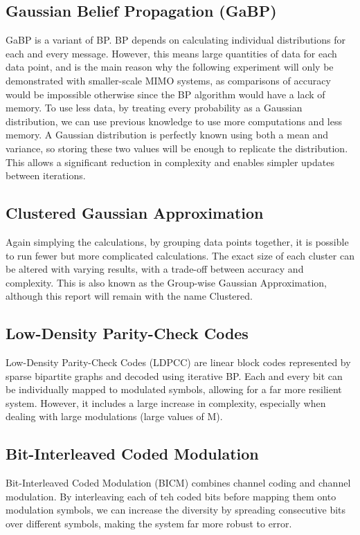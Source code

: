 \documentclass[conference]{IEEEtran}
\begin{document}
\subsection{Gaussian Belief Propagation (GaBP)}
GaBP is a variant of BP. BP depends on calculating individual distributions for each and every message. However, this means large quantities of data for each data point, and is the main reason why the following experiment will only be demonstrated with smaller-scale MIMO systems, as comparisons of accuracy would be impossible otherwise since the BP algorithm would have a lack of memory. To use less data, by treating every probability as a Gaussian distribution, we can use previous knowledge to use more computations and less memory. A Gaussian distribution is perfectly known using both a mean and variance, so storing these two values will be enough to replicate the distribution. This allows a significant reduction in complexity and enables simpler updates between iterations.

\subsection{Clustered Gaussian Approximation}
Again simplying the calculations, by grouping data points together, it is possible to run fewer but more complicated calculations. The exact size of each cluster can be altered with varying results, with a trade-off between accuracy and complexity. This is also known as the Group-wise Gaussian Approximation, although this report will remain with the name Clustered.

\subsection{Low-Density Parity-Check Codes}
Low-Density Parity-Check Codes (LDPCC) are linear block codes represented by sparse bipartite graphs and decoded using iterative BP. Each and every bit can be individually mapped to modulated symbols, allowing for a far more resilient system. However, it includes a large increase in complexity, especially when dealing with large modulations (large values of M).

\subsection{Bit-Interleaved Coded Modulation}
Bit-Interleaved Coded Modulation (BICM) combines channel coding and channel modulation. By interleaving each of teh coded bits before mapping them onto modulation symbols, we can increase the diversity by spreading consecutive bits over different symbols, making the system far more robust to error.
\end{document}
